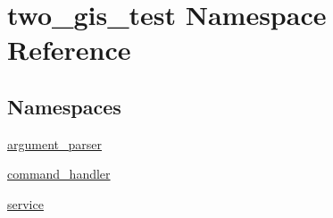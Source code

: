 \hypertarget{namespacetwo__gis__test}{}\section{two\+\_\+gis\+\_\+test Namespace Reference}
\label{namespacetwo__gis__test}
\subsection*{Namespaces}
\begin{DoxyCompactItemize}
\item 
 \hyperlink{namespacetwo__gis__test_1_1argument__parser}{argument\+\_\+parser}
\item 
 \hyperlink{namespacetwo__gis__test_1_1command__handler}{command\+\_\+handler}
\item 
 \hyperlink{namespacetwo__gis__test_1_1service}{service}
\end{DoxyCompactItemize}
